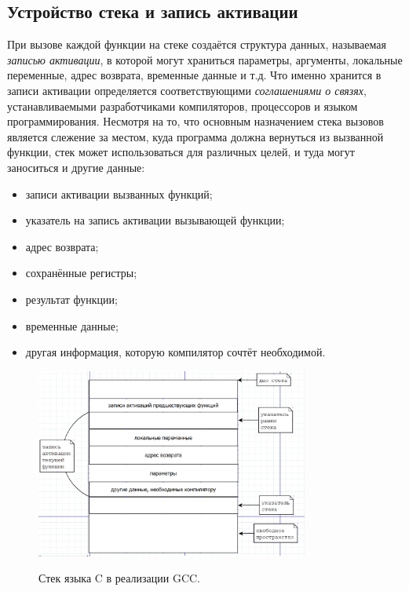 \subsection{Устройство стека и запись активации}
При вызове каждой функции на стеке создаётся структура данных, называемая \emph{записью активации}, в которой могут храниться параметры, аргументы, локальные переменные, адрес возврата, временные данные и т.д. Что именно хранится в записи активации определяется соответствующими \emph{соглашениями о связях}, устанавливаемыми разработчиками компиляторов, процессоров и языком программирования. Несмотря на то, что основным назначением стека вызовов является слежение за местом, куда программа должна вернуться из вызванной функции, стек может использоваться для различных целей, и туда могут заноситься и другие данные:
\begin{itemize}
\item записи активации вызванных функций;
\item указатель на запись активации вызывающей функции;
\item адрес возврата;
\item сохранённые регистры;
\item результат функции;
\item временные данные;
\item другая информация, которую компилятор сочтёт необходимой.
\end{itemize}

\begin{figure}[h]
\centering
\includegraphics[width=0.8\textwidth]{Berezun/StackFrameC.png}\\
\caption{Стек языка C в реализации GCC.}
\end{figure}

